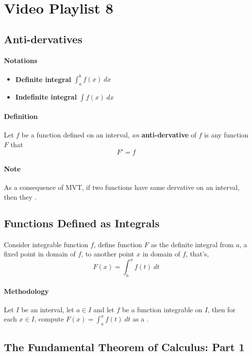 \documentclass{article}
\begin{document}
	\section{Video Playlist 8}
	\subsection{Anti-dervatives}
	\paragraph{Notations}
	\begin{itemize}
		\item \textbf{Definite integral} $\int_a^b{f(x)}\ dx$
		\item \textbf{Indefinite integral} $\int{f(x)}\ dx$
	\end{itemize}
	\paragraph{Definition} Let $f$ be a function defined on an interval, \emph{an} \textbf{anti-dervative} of $f$ is any function $F$ that
	\[
	F' = f
	\]
	\paragraph{Note} As a consequence of MVT, if two functions have same dervative on an interval, then they .
	
	\subsection{Functions Defined as Integrals}
	\paragraph{} Consider integrable function $f$, define function $F$ as the definite integral from $a$, a fixed point in domain of $f$, to another point $x$ in domain of $f$, that's,
	\[
	F(x) = \int_a^x{f(t)\ dt}
	\]
	\paragraph{Methodology} Let $I$ be an interval, let $a \in I$ and let $f$ be a function integrable on $I$, then for each $x \in I$, compute $F(x) = \int_a^x{f(t)\ dt}$ as a .
	
	\subsection{The Fundamental Theorem of Calculus: Part 1}
\end{document}

